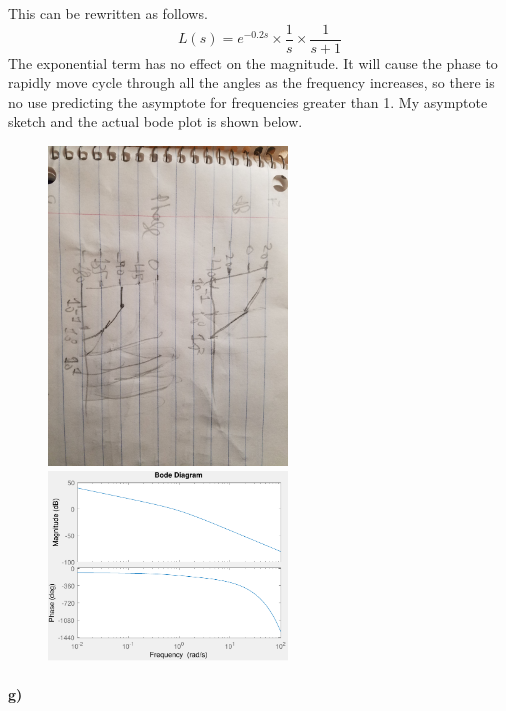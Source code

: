 \documentclass[12pt]{article}
\begin{document}
This can be rewritten as follows.
\[L(s)=e^{-0.2s}\times\frac{1}{s}\times\frac{1}{s+1}\]
The exponential term has no effect on the magnitude. It will cause the phase to rapidly move cycle through all the angles as the frequency
increases, so there is no use predicting the asymptote for frequencies greater than 1.
My asymptote sketch and the actual bode plot is shown below.
\begin{figure}[H]
    \begin{center}
        \includegraphics[width=2.5in]{problem1f.jpg}
        \includegraphics[width=2.5in]{problem1f.pdf}
    \end{center}
\end{figure}

\paragraph{g)}
\end{document}
